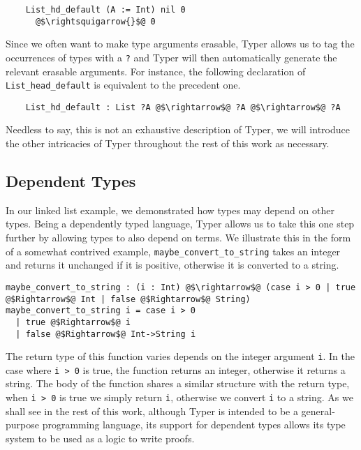 \documentclass[12pt,twoside,maitrise]{dms}
\theoremstyle{definition}
\numberwithin{equation}{section}
\numberwithin{table}{chapter}
\numberwithin{figure}{chapter}
\newcommand\id[1] {\texttt{#1}}
\newcommand\fn[1] {\texttt{#1}}
\begin{document}
\begin{verbatim}
    List_hd_default (A := Int) nil 0
      @$\rightsquigarrow{}$@ 0
\end{verbatim}

Since we often want to make type arguments erasable, Typer allows us to tag the
occurrences of types with a \id{?} and Typer will then automatically generate
the relevant erasable arguments. For instance, the following declaration of
\id{List_head_default} is equivalent to the precedent one.

\begin{verbatim}
    List_hd_default : List ?A @$\rightarrow$@ ?A @$\rightarrow$@ ?A
\end{verbatim}

Needless to say, this is not an exhaustive description of Typer, we will
introduce the other intricacies of Typer throughout the rest of this work as
necessary.

\subsection{Dependent Types}

In our linked list example, we demonstrated how types may depend on other
types. Being a dependently typed language, Typer allows us to take this one
step further by allowing types to also depend on terms. We illustrate this in
the form of a somewhat contrived example, \id{maybe_convert_to_string} takes an
integer and returns it unchanged if it is positive, otherwise it is converted
to a string.

\begin{verbatim}
maybe_convert_to_string : (i : Int) @$\rightarrow$@ (case i > 0 | true @$Rightarrow$@ Int | false @$Rightarrow$@ String)
maybe_convert_to_string i = case i > 0
  | true @$Rightarrow$@ i
  | false @$Rightarrow$@ Int->String i
\end{verbatim}

The return type of this function varies depends on the integer argument \id{i}.
In the case where \fn{i > 0} is true, the function returns an integer,
otherwise it returns a string. The body of the function shares a similar
structure with the return type, when \fn{i > 0} is true we simply return
\id{i}, otherwise we convert \id{i} to a string. As we shall see in the rest of
this work, although Typer is intended to be a general-purpose programming
language, its support for dependent types allows its type system to be used as
a logic to write proofs.
\end{document}
